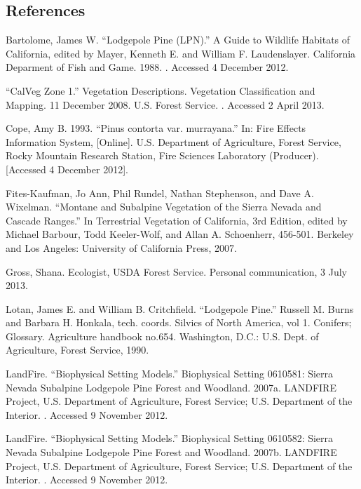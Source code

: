 \subsection*{References}
\begin{hangparas}{.25in}{1} 
Bartolome, James W. ``Lodgepole Pine (LPN).'' A Guide to Wildlife Habitats of California, edited by Mayer, Kenneth E. and William F. Laudenslayer. California Deparment of Fish and Game. 1988. . Accessed 4 December 2012.

``CalVeg Zone 1.'' Vegetation Descriptions. Vegetation Classification and Mapping.  11 December 2008. U.S. Forest Service. . Accessed 2 April 2013.

Cope, Amy B. 1993. ``Pinus contorta var. murrayana.'' In: Fire Effects Information System, [Online].  U.S. Department of Agriculture, Forest Service,  Rocky Mountain Research Station, Fire Sciences Laboratory (Producer).   [Accessed 4 December 2012].

Fites-Kaufman, Jo Ann, Phil Rundel, Nathan Stephenson, and Dave A. Wixelman. ``Montane and Subalpine Vegetation of the Sierra Nevada and Cascade Ranges.'' In Terrestrial Vegetation of California, 3rd Edition, edited by Michael Barbour, Todd Keeler-Wolf, and Allan A. Schoenherr, 456-501. Berkeley and Los Angeles: University of California Press, 2007. 

Gross, Shana. Ecologist, USDA Forest Service. Personal communication, 3 July 2013.

Lotan, James E. and William B. Critchfield. ``Lodgepole Pine.'' Russell M. Burns and Barbara H. Honkala, tech. coords. Silvics of North America, vol 1. Conifers; Glossary. Agriculture handbook no.654. Washington, D.C.: U.S. Dept. of Agriculture, Forest Service, 1990. 

LandFire. ``Biophysical Setting Models.'' Biophysical Setting 0610581: Sierra Nevada Subalpine Lodgepole Pine Forest and Woodland. 2007a. LANDFIRE Project, U.S. Department of Agriculture, Forest Service; U.S. Department of the Interior. . Accessed 9 November 2012.

LandFire. ``Biophysical Setting Models.'' Biophysical Setting 0610582: Sierra Nevada Subalpine Lodgepole Pine Forest and Woodland. 2007b. LANDFIRE Project, U.S. Department of Agriculture, Forest Service; U.S. Department of the Interior. . Accessed 9 November 2012.


\end{hangparas}
